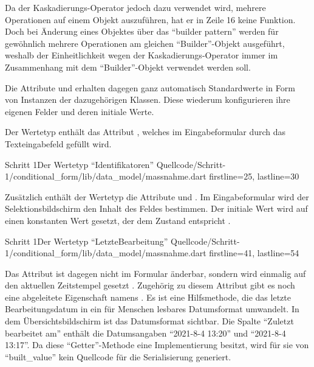 Da der Kaskadierungs-Operator jedoch dazu verwendet wird, mehrere Operationen auf einem Objekt auszuführen, hat er in Zeile 16 keine Funktion.
Doch bei Änderung eines Objektes über das \enquote{builder pattern} werden für gewöhnlich mehrere Operationen am gleichen \enquote{Builder}-Objekt ausgeführt, weshalb der Einheitlichkeit wegen der Kaskadierungs-Operator immer im Zusammenhang mit dem \enquote{Builder}-Objekt verwendet werden soll.

Die Attribute  und   erhalten dagegen ganz automatisch Standardwerte in Form von Instanzen der dazugehörigen Klassen.
Diese wiederum konfigurieren ihre eigenen Felder und deren initiale Werte.



Der Wertetyp  enthält das Attribut  ,
welches im Eingabeformular durch das Texteingabefeld gefüllt wird.

\begin{alexlisting}{Schritt 1}{Der Wertetyp \enquote{Identifikatoren}}
  {Quellcode/Schritt-1/conditional_form/lib/data_model/massnahme.dart}
  {firstline=25, lastline=30}
  \label{lst:Schritt1WerteTypIdentifikatoren}
\end{alexlisting}

Zusätzlich enthält der Wertetyp  die Attribute
 
und  .
Im Eingabeformular wird der Selektionsbildschirm den Inhalt des Feldes  bestimmen.
Der initiale Wert wird auf einen konstanten Wert gesetzt, der dem Zustand  entspricht . 

\begin{alexlisting}{Schritt 1}{Der Wertetyp \enquote{LetzteBearbeitung}}
  {Quellcode/Schritt-1/conditional_form/lib/data_model/massnahme.dart}
  {firstline=41, lastline=54}
  \label{lst:Schritt1WerteTypLetzteBearbeitung}
\end{alexlisting}

Das Attribut  ist dagegen nicht im Formular änderbar,
sondern wird einmalig auf den aktuellen Zeitstempel gesetzt . 
Zugehörig zu diesem Attribut gibt es noch eine abgeleitete Eigenschaft namens  .
Es ist eine Hilfsmethode, die das letzte Bearbeitungsdatum in ein für Menschen lesbares Datumsformat umwandelt.
In dem Übersichtsbildschirm  ist das Datumsformat sichtbar.
Die Spalte \enquote{Zuletzt bearbeitet am} enthält die Datumsangaben \enquote{2021-8-4 13:20} und \enquote{2021-8-4 13:17}. 
Da diese \enquote{Getter}-Methode eine Implementierung besitzt, wird für sie von \enquote{built_value} kein Quellcode für die Serialisierung generiert. 

